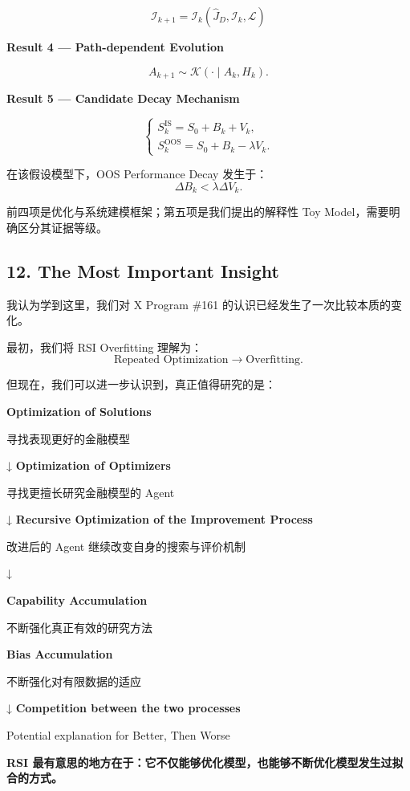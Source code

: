 \[\boxed{
\mathcal I_{k+1}
=
\mathcal I_k
(\widehat J_D,\mathcal I_k,\mathcal L)
}\]

\textbf{Result 4 --- Path-dependent Evolution}

\[A_{k+1}\sim\mathcal K(\cdot\mid A_k,H_k).\]

\textbf{Result 5 --- Candidate Decay Mechanism}

\[\begin{cases}
S_k^{\mathrm{IS}}=S_0+B_k+V_k,\\
S_k^{\mathrm{OOS}}=S_0+B_k-\lambda V_k.
\end{cases}\]

在该假设模型下，OOS Performance Decay 发生于：
\[\Delta B_k<\lambda\Delta V_k.\]

前四项是优化与系统建模框架；第五项是我们提出的解释性 Toy Model，需要明确区分其证据等级。

\hypertarget{part-3-37-0001-the-most-important-insight}{%
\subsection{12. The Most Important Insight}\label{part-3-37-0001-the-most-important-insight}}

我认为学到这里，我们对 X Program \#161 的认识已经发生了一次比较本质的变化。

最初，我们将 RSI Overfitting 理解为：
\[\text{Repeated Optimization}
\longrightarrow
\text{Overfitting}.\]

但现在，我们可以进一步认识到，真正值得研究的是：

\textbf{Optimization of Solutions}

寻找表现更好的金融模型

↓ \textbf{Optimization of Optimizers}

寻找更擅长研究金融模型的 Agent

↓ \textbf{Recursive Optimization of the Improvement Process}

改进后的 Agent 继续改变自身的搜索与评价机制

↓

\textbf{Capability Accumulation}

不断强化真正有效的研究方法

\textbf{Bias Accumulation}

不断强化对有限数据的适应

↓ \textbf{Competition between the two processes}

Potential explanation for Better, Then Worse

\textbf{RSI 最有意思的地方在于：它不仅能够优化模型，也能够不断优化模型发生过拟合的方式。}


